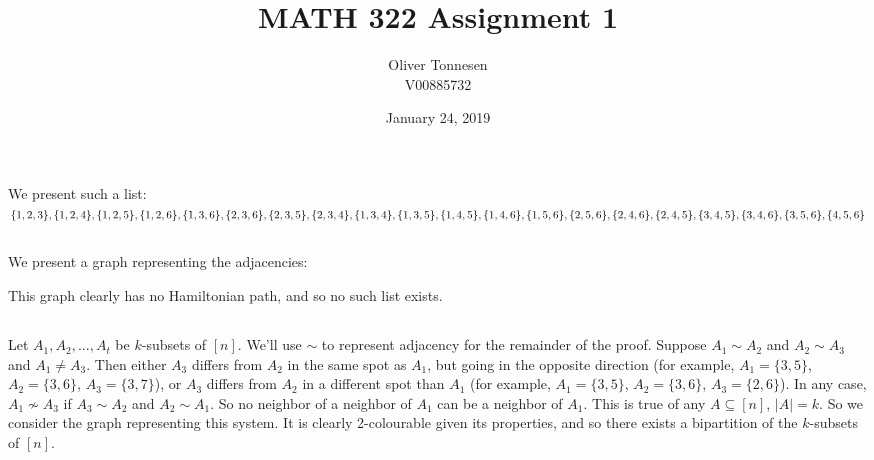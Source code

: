 \documentclass{article}
\title{MATH 322 Assignment 1}
\author{Oliver Tonnesen\\V00885732}
\date{January 24, 2019}
\begin{document}
\maketitle
\renewcommand{\thesubsection}{\thesection.\alph{subsection}}
\section{} %
\subsection{} %
We present such a list:\\
$\{1,2,3\},\{1,2,4\},\{1,2,5\},\{1,2,6\},\{1,3,6\},\{2,3,6\},\{2,3,5\},\{2,3,4\},\\
\{1,3,4\},\{1,3,5\},\{1,4,5\},\{1,4,6\},\{1,5,6\},\{2,5,6\},\{2,4,6\},\{2,4,5\},\\
\{3,4,5\},\{3,4,6\},\{3,5,6\},\{4,5,6\}$
\subsection{} %
We present a graph representing the adjacencies:
\newline
\newline
{}
\newline
\newline
This graph clearly has no Hamiltonian path, and so no such list exists.
\subsection{} %
Let $A_1,A_2,...,A_t$ be $k$-subsets of $[n]$. We'll use $\sim$ to represent
adjacency for the remainder of the proof.
\newline
\newline
Suppose $A_1\sim A_2$ and $A_2\sim A_3$ and $A_1\neq A_3$. Then either $A_3$
differs from $A_2$ in the same spot as $A_1$, but going in the opposite
direction (for example, $A_1=\{3,5\}$, $A_2=\{3,6\}$, $A_3=\{3,7\}$), or $A_3$
differs from $A_2$ in a different spot than $A_1$ (for example, $A_1=\{3,5\}$,
$A_2=\{3,6\}$, $A_3=\{2,6\}$). In any case, $A_1\not\sim A_3$ if $A_3\sim A_2$
and $A_2\sim A_1$. So no neighbor of a neighbor of $A_1$ can be a neighbor of
$A_1$. This is true of any $A\subseteq[n]$, $|A|=k$. So we consider the graph
representing this system. It is clearly 2-colourable given its properties, and
so there exists a bipartition of the $k$-subsets of $[n]$.
\end{document}
